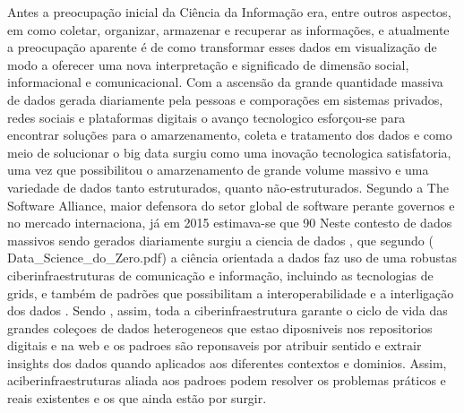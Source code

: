  Antes a preocupação inicial da Ciência da Informação era, entre outros aspectos, em como coletar, organizar, armazenar e recuperar as informações, e atualmente a  preocupação aparente é de como transformar esses dados em visualização de modo a oferecer uma nova interpretação e significado de dimensão social, informacional e comunicacional. Com a ascensão da grande quantidade massiva de dados gerada diariamente pela pessoas e comporações em sistemas privados, redes sociais e plataformas digitais  o avanço tecnologico esforçou-se para encontrar soluções para o amarzenamento, coleta  e tratamento dos dados  e como meio de solucionar  o  big data surgiu como uma inovação tecnologica satisfatoria, uma vez que possibilitou o amarzenamento de grande volume massivo e uma variedade de dados tanto estruturados,  quanto não-estruturados. Segundo  a The Software Alliance,  maior defensora do setor global de software perante governos e no mercado internaciona, já em 2015  estimava-se que 90%
  Neste contesto de dados massivos sendo gerados diariamente surgiu a ciencia de dados , que segundo  ( Data_Science_do_Zero.pdf) a  ciência  orientada a dados faz uso de uma robustas ciberinfraestruturas de comunicação e informação, incluindo as tecnologias de grids, e também de padrões que possibilitam a interoperabilidade e a interligação dos dados . Sendo , assim, toda a ciberinfraestrutura garante o  ciclo de vida das grandes coleçoes de dados heterogeneos  que estao diposniveis nos repositorios digitais  e na web e os padroes são reponsaveis por atribuir sentido  e extrair insights dos dados quando aplicados aos diferentes contextos e dominios. Assim, aciberinfraestruturas aliada aos padroes podem resolver os  problemas práticos e reais existentes e os que ainda estão por surgir. 
